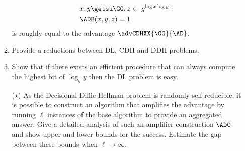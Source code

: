 \documentclass{article}
\begin{document}
\begin{enumerate}
\begin{enumerate}
\begin{align*}
{{\begin{aligned}
        &x,y\getsu\GG, z\gets g^{\log x\log y}:\\ 
        &\ADB(x,y,z)=1
      \end{aligned}}}
    \end{align*}
    is roughly equal to the advantage $\advCDHXX{\GG}{\AD}$. 
  \item Provide a  reductions between DL, CDH and DDH problems.
  \item Show that if there exists an efficient procedure that can
    always compute the highest bit of $\log_g y$ then the DL problem
    is easy.
  \item[($\star$)] As the Decisional Diffie-Hellman problem is
    randomly self-reducible, it is possible to construct an algorithm
    that amplifies the advantage by running $\ell$ instances of the
    base algorithm to provide an aggregated answer. Give a detailed 
    analysis of such an amplifier construction $\ADC$ and show upper and 
    lower bounds for the success. Estimate the gap between these bounds
    when $\ell\to\infty$.
  \end{enumerate}
\end{enumerate}
\end{document}
